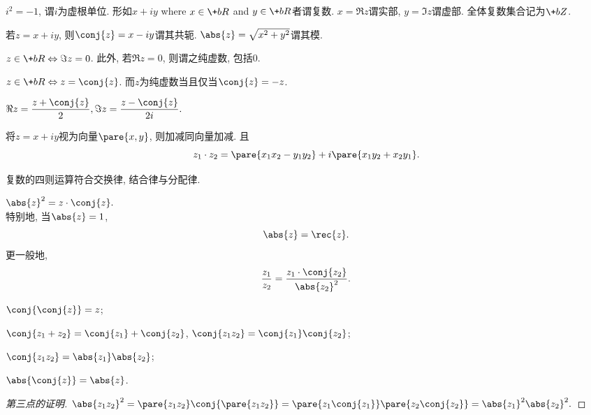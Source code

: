 \documentclass[../ComplexVariable.tex]{subfiles}
\begin{document}
\begin{definition}
    $i^2=-1$, 谓$i$为虚根单位. 形如$x+iy$ where $x\in \+bR$ and $y\in \+bR$者谓复数. $x=\Re z$谓实部, $y= \Im z$谓虚部. 全体复数集合记为$\+bZ$.\par
    若$z=x+iy$, 则$\conj{z}=x-iy$谓其共轭. $\abs{z} = \sqrt{x^2+y^2}$谓其模.
\end{definition}
\begin{lemma}
    $z\in\+bR\Leftrightarrow \Im z = 0$. 此外, 若$\Re z=0$, 则谓之纯虚数, 包括$0$.
\end{lemma}
\begin{lemma}
    \label{lem:实数或虚数的判断}
    $z\in\+bR\Leftrightarrow z=\conj{z}$. 而$z$为纯虚数当且仅当$\conj{z}=-z$.
\end{lemma}
\begin{lemma}
    $\displaystyle \Re z = \frac{z+\conj{z}}{2}, \Im z = \frac{z-\conj{z}}{2i}.$
\end{lemma}
\begin{definition}
    将$z=x+iy$视为向量$\pare{x,y}$, 则加减同向量加减. 且
    \[ z_1\cdot z_2 = \pare{x_1x_2-y_1y_2} + i\pare{x_1y_2 + x_2y_1}. \]
\end{definition}
\begin{lemma}
    复数的四则运算符合交换律, 结合律与分配律.
\end{lemma}
\begin{proposition}
    \hfill $\abs{z}^2 = z\cdot\conj{z}.$ \hfill\mbox{}\\
    特别地, 当$\abs{z} = 1$, 
    \[ \abs{z} = \rec{z}. \]
    更一般地,
    \[ \frac{z_1}{z_2} = \frac{z_1\cdot\conj{z_2}}{\abs{z_2}^2}. \]
\end{proposition}
\begin{proposition}[共轭的性质]\leavevmode
    \begin{cenum}
        \item $\conj{\conj{z}} = z$;
        \item $\conj{z_1+z_2} = \conj{z_1}+\conj{z_2}$, $\conj{z_1z_2} = \conj{z_1}\conj{z_2}$;
        \item $\conj{z_1z_2} = \abs{z_1}\abs{z_2}$;
        \item $\abs{\conj{z}} = \abs{z}$.
    \end{cenum}
\end{proposition}
\begin{proof}[第三点的证明]$\abs{z_1z_2}^2 = \pare{z_1z_2}\conj{\pare{z_1z_2}} = \pare{z_1\conj{z_1}}\pare{z_2\conj{z_2}} = \abs{z_1}^2\abs{z_2}^2.$
\end{proof}
\end{document}
